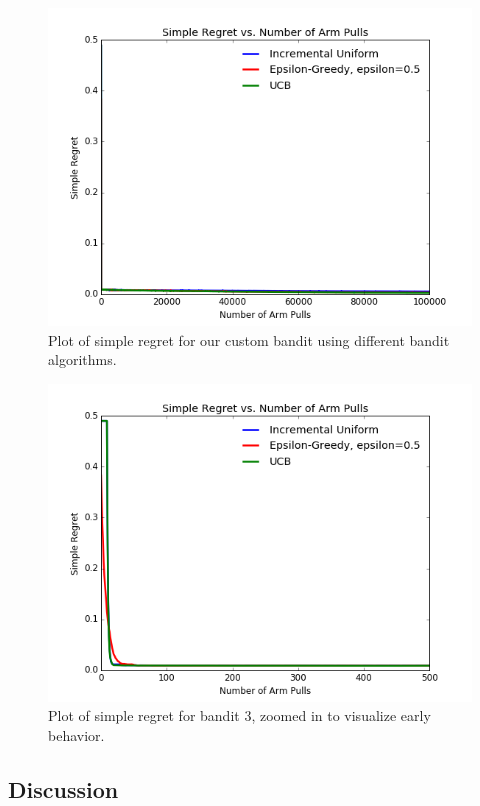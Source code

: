 \documentclass[paper=a4, fontsize=11pt]{scrartcl}
\begin{document}
\begin{figure}
\centering
	\includegraphics[width=.8\linewidth]{custom_bandit_simple_regret.png}
\caption{Plot of simple regret for our custom bandit using different bandit algorithms.}
\label{fig:simple_bandit3}
\end{figure}

\begin{figure}
\centering
	\includegraphics[width=1\linewidth]{custom_bandit_simple_regret_zoomed.png}
\caption{Plot of simple regret for bandit 3, zoomed in to visualize early behavior.}
\label{fig:simple_bandit3_zoomed}
\end{figure}

\subsection{Discussion}
\end{document}
